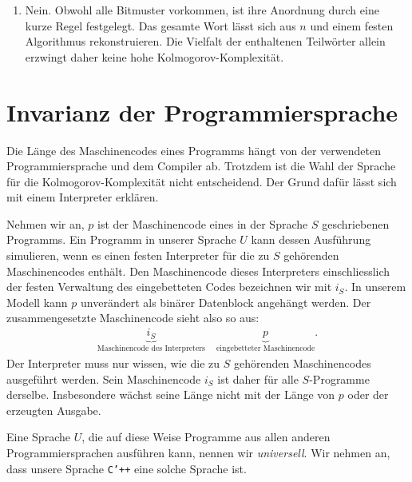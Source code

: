 \begin{myexercise}
\begin{myanswer}
\begin{enumerate}
			\begin{align*}
				C(w_n)\leq\abs{bin(n)}+c.
			\end{align*}
			Für $n=1024$ hat das Wort $1024\cdot 2^{1024}$ Bits, während $bin(1024)=10000000000$ nur $11$ Bits hat. Also ist $C(w_{1024})\leq 11+c$. Der während der Ausführung benötigte Speicher für die Liste gehört nicht zur Länge des Maschinencodes.
			\item Nein. Obwohl alle Bitmuster vorkommen, ist ihre Anordnung durch eine kurze Regel festgelegt. Das gesamte Wort lässt sich aus $n$ und einem festen Algorithmus rekonstruieren. Die Vielfalt der enthaltenen Teilwörter allein erzwingt daher keine hohe Kolmogorov-Komplexität.
		\end{enumerate}
	\end{myanswer}
\end{myexercise}

\section{Invarianz der Programmiersprache}\label{sec:Sprachinvarianz}
Die Länge des Maschinencodes eines Programms hängt von der verwendeten Programmiersprache und dem Compiler ab. Trotzdem ist die Wahl der Sprache für die Kolmogorov-Komplexität nicht entscheidend. Der Grund dafür lässt sich mit einem Interpreter erklären.

Nehmen wir an, $p$ ist der Maschinencode eines in der Sprache $S$ geschriebenen Programms. Ein Programm in unserer Sprache $U$ kann dessen Ausführung simulieren, wenn es einen festen Interpreter für die zu $S$ gehörenden Maschinencodes enthält. Den Maschinencode dieses Interpreters einschliesslich der festen Verwaltung des eingebetteten Codes bezeichnen wir mit $i_S$. In unserem Modell kann $p$ unverändert als binärer Datenblock angehängt werden. Der zusammengesetzte Maschinencode sieht also so aus:
\begin{align*}
	\underbrace{i_S}_{\text{Maschinencode des Interpreters}}\quad
	\underbrace{p}_{\text{eingebetteter Maschinencode}}.
\end{align*}
Der Interpreter muss nur wissen, wie die zu $S$ gehörenden Maschinencodes ausgeführt werden. Sein Maschinencode $i_S$ ist daher für alle $S$-Programme derselbe. Insbesondere wächst seine Länge nicht mit der Länge von $p$ oder der erzeugten Ausgabe.

Eine Sprache $U$, die auf diese Weise Programme aus allen anderen Programmiersprachen ausführen kann, nennen wir \textit{universell}. Wir nehmen an, dass unsere Sprache \texttt{C'++} eine solche Sprache ist.

